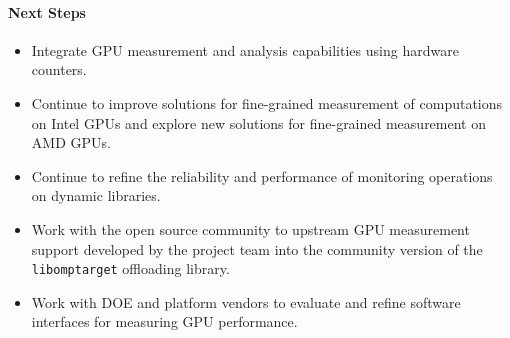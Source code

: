 \paragraph{Next Steps}
\begin{itemize}

\item 
Integrate GPU measurement and analysis capabilities using hardware counters.

\item 
Continue to improve solutions for fine-grained measurement of computations on Intel GPUs and explore new solutions for fine-grained measurement on AMD GPUs.

\item 
Continue to refine the reliability and performance of monitoring operations on dynamic libraries.

\item 
Work with the open source community to upstream GPU measurement support
developed by the project team into the community version of the {\tt
libomptarget} offloading library.

\item 
Work with DOE and platform vendors to evaluate and refine software interfaces for measuring GPU performance.

\end{itemize}
